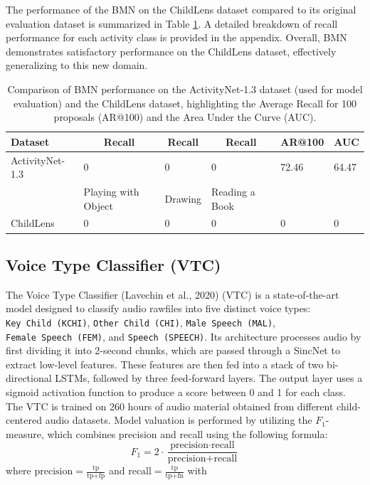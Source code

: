 \documentclass[
  man,floatsintext]{apa6}
\begin{document}
The performance of the BMN on the ChildLens dataset compared to its original evaluation dataset is summarized in Table \ref{tab:bmn-results}. A detailed breakdown of recall performance for each activity class is provided in the appendix. Overall, BMN demonstrates satisfactory performance on the ChildLens dataset, effectively generalizing to this new domain.

\begin{table}[tbp]

\begin{center}
\begin{threeparttable}

\caption{\label{tab:bmn-results}Comparison of BMN performance on the ActivityNet-1.3 dataset (used for model evaluation) and the ChildLens dataset, highlighting the Average Recall for 100 proposals (AR@100) and the Area Under the Curve (AUC).}

\begin{tabular}{llllll}
\toprule
Dataset & \multicolumn{1}{c}{Recall} & \multicolumn{1}{c}{Recall} & \multicolumn{1}{c}{Recall} & \multicolumn{1}{c}{AR@100} & \multicolumn{1}{c}{AUC}\\
\midrule
ActivityNet-1.3 & 0 & 0 & 0 & 72.46 & 64.47\\
 & Playing with Object & Drawing & Reading a Book &  & \\
ChildLens & 0 & 0 & 0 & 0 & 0\\
\bottomrule
\end{tabular}

\end{threeparttable}
\end{center}

\end{table}

\subsection{Voice Type Classifier (VTC)}\label{voice-type-classifier-vtc}

The Voice Type Classifier (Lavechin et al., 2020) (VTC) is a state-of-the-art model designed to classify audio rawfiles into five distinct voice types: \texttt{Key\ Child\ (KCHI)}, \texttt{Other\ Child\ (CHI)}, \texttt{Male\ Speech\ (MAL)}, \texttt{Female\ Speech\ (FEM)}, and \texttt{Speech\ (SPEECH)}. Its architecture processes audio by first dividing it into 2-second chunks, which are passed through a SincNet to extract low-level features. These features are then fed into a stack of two bi-directional LSTMs, followed by three feed-forward layers. The output layer uses a sigmoid activation function to produce a score between 0 and 1 for each class. The VTC is trained on 260 hours of audio material obtained from different child-centered audio datasets. Model valuation is performed by utilizing the \(F_1\)-measure, which combines precision and recall using the following formula:
\[
F_1 = 2 \cdot \frac{\text{precision} \cdot \text{recall}}{\text{precision} + \text{recall}}
\]
where \(\text{precision} = \frac{\text{tp}}{\text{tp} + \text{fp}}\) and \(\text{recall} = \frac{\text{tp}}{\text{tp} + \text{fn}}\) with
\end{document}
